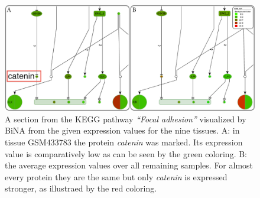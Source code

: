 
\begin{figure}[htbp]
 \centering
 \includegraphics[scale=0.7]{./img/fad_scaled.png}
 \caption{A section from the KEGG pathway \textit{``Focal adhesion''} visualized
by BiNA from the given expression values for the nine tissues. A: in tissue
GSM433783 the protein \textit{catenin} was marked. Its expression value is
comparatively low as can be seen by the green coloring. B: the average
expression values over all remaining samples. For almost every protein they are
the same but only \textit{catenin} is expressed stronger, as illustraed by the
red coloring.}
\label{fig:focAd}
\end{figure}

